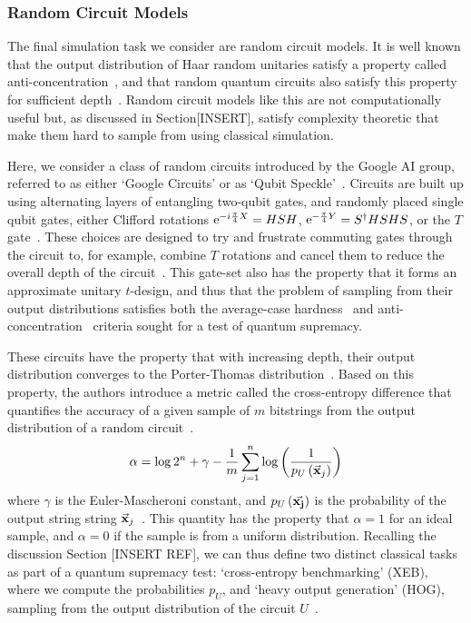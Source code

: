 \subsubsection*{Random Circuit Models}
The final simulation task we consider are random circuit models. It is well known that the output distribution of Haar random unitaries satisfy a property called anti-concentration~\cite{Hangleiter2017}, and that random quantum circuits also satisfy this property for sufficient depth~\cite{Aaronson2016,Emerson2098,Harrow2017}. Random circuit models like this are not computationally useful but, as discussed in Section[INSERT], satisfy complexity theoretic that make them hard to sample from using classical simulation.\par
Here, we consider a class of random circuits introduced by the Google AI group, referred to as either `Google Circuits' or as `Qubit Speckle'~\cite{Aaronson2016,Martinis2016}. Circuits are built up using alternating layers of entangling two-qubit gates, and randomly placed single qubit gates, either Clifford rotations $\mathrm{e}^{-i\frac{\pi}{4} X}=HSH$, $\mathrm{e}^{-\frac{\pi}{4} Y}=S^{\dagger}HSHS$, or the $T$ gate~\cite{Boixo2016}. These choices are designed to try and frustrate commuting gates through the circuit to, for example, combine $T$ rotations and cancel them to reduce the overall depth of the circuit~\cite{Harrow2017}. This gate-set also has the property that it forms an approximate unitary $t$-design, and thus that the problem of sampling from their output distributions satisfies both the average-case hardness~\cite{Bouland2018,Movassagh2018} and anti-concentration~\cite{Brandao2010,Hangleiter2017} criteria sought for a test of quantum supremacy.\par
These circuits have the property that with increasing depth, their output distribution converges to the Porter-Thomas distribution~\cite{Boixo2016}. Based on this property, the authors introduce a metric called the cross-entropy difference that quantifies the accuracy of a given sample of $m$ bitstrings from the output distribution of a random circuit~\cite{Boixo2016}.
\begin{equation}
\alpha = \log{2^{n}} +\gamma -\frac{1}{m}\sum_{j=1}^{n}\log\left(\frac{1}{p_{U}\left(\va{x}_{j}\right)}\right)
\label{eq:cross_entropy}
\end{equation}
where $\gamma$ is the Euler-Mascheroni constant, and $p_{U}\left(\va{x_{j}}\right)$ is the probability of the output string string $\va{x}_{j}$~\cite{Boixo2016}. This quantity has the property that $\alpha=1$ for an ideal sample, and $\alpha=0$ if the sample is from a uniform distribution. Recalling the discussion Section [INSERT REF], we can thus define two distinct classical tasks as part of a quantum supremacy test: `cross-entropy benchmarking' (XEB), where we compute the probabilities $p_{U}$, and `heavy output generation' (HOG), sampling from the output distribution of the circuit $U$~\cite{Aaronson2016,Villalonga2019}.\par
